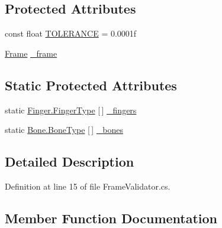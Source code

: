 \subsection*{Protected Attributes}
\begin{DoxyCompactItemize}
\item 
const float \mbox{\hyperlink{class_leap_1_1_unity_1_1_tests_1_1_frame_validator_aa8c9adab76646f9e1d8fefa1d909102d}{T\+O\+L\+E\+R\+A\+N\+CE}} = 0.\+0001f
\item 
\mbox{\hyperlink{class_leap_1_1_frame}{Frame}} \mbox{\hyperlink{class_leap_1_1_unity_1_1_tests_1_1_frame_validator_ab0fd118aae62aad4db938a4e919f237b}{\+\_\+frame}}
\end{DoxyCompactItemize}
\subsection*{Static Protected Attributes}
\begin{DoxyCompactItemize}
\item 
static \mbox{\hyperlink{class_leap_1_1_finger_ae75e8d46a01aff0bd5c6d6fb99e2f2ba}{Finger.\+Finger\+Type}} \mbox{[}$\,$\mbox{]} \mbox{\hyperlink{class_leap_1_1_unity_1_1_tests_1_1_frame_validator_aa3a5c6d3225a94d925a57a2c4f332107}{\+\_\+fingers}}
\item 
static \mbox{\hyperlink{class_leap_1_1_bone_a21054e31cefa7b75f25a026006fdbb1b}{Bone.\+Bone\+Type}} \mbox{[}$\,$\mbox{]} \mbox{\hyperlink{class_leap_1_1_unity_1_1_tests_1_1_frame_validator_a841c73eaa5d5f6c83bfafb4ee87351b8}{\+\_\+bones}}
\end{DoxyCompactItemize}


\subsection{Detailed Description}


Definition at line 15 of file Frame\+Validator.\+cs.



\subsection{Member Function Documentation}
\mbox{\label{class_leap_1_1_unity_1_1_tests_1_1_frame_validator_ad7ea32888c180b40f2c0a01bbbb97a82}} 
